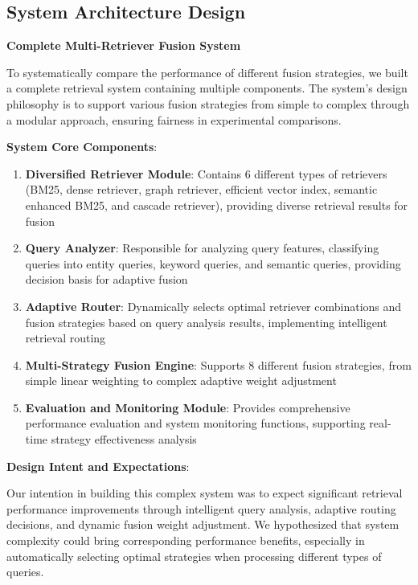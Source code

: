 \documentclass[letterpaper]{article} %
\begin{document}
\subsection{System Architecture Design}

\textbf{Complete Multi-Retriever Fusion System}

To systematically compare the performance of different fusion strategies, we built a complete retrieval system containing multiple components. The system's design philosophy is to support various fusion strategies from simple to complex through a modular approach, ensuring fairness in experimental comparisons.

\textbf{System Core Components}:

\begin{enumerate}
\item \textbf{Diversified Retriever Module}: Contains 6 different types of retrievers (BM25, dense retriever, graph retriever, efficient vector index, semantic enhanced BM25, and cascade retriever), providing diverse retrieval results for fusion

\item \textbf{Query Analyzer}: Responsible for analyzing query features, classifying queries into entity queries, keyword queries, and semantic queries, providing decision basis for adaptive fusion

\item \textbf{Adaptive Router}: Dynamically selects optimal retriever combinations and fusion strategies based on query analysis results, implementing intelligent retrieval routing

\item \textbf{Multi-Strategy Fusion Engine}: Supports 8 different fusion strategies, from simple linear weighting to complex adaptive weight adjustment

\item \textbf{Evaluation and Monitoring Module}: Provides comprehensive performance evaluation and system monitoring functions, supporting real-time strategy effectiveness analysis
\end{enumerate}

\textbf{Design Intent and Expectations}:

Our intention in building this complex system was to expect significant retrieval performance improvements through intelligent query analysis, adaptive routing decisions, and dynamic fusion weight adjustment. We hypothesized that system complexity could bring corresponding performance benefits, especially in automatically selecting optimal strategies when processing different types of queries.
\end{document}
